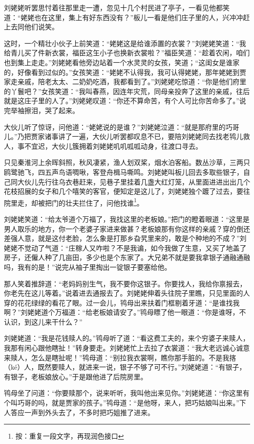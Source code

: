 \documentclass[12pt,oneside]{book}
\begin{document}
刘姥姥听罢思忖着往那里走一遭，忽见十几个村民进了亭子，一看见他都笑道：“姥姥也在这里，集上有好东西没有？”板儿一看是他们庄子里的人，兴冲冲赶上去同他们说笑。

这时，一个精壮小伙子上前笑道：“姥姥这是给谁添置的衣裳？”刘姥姥笑道：“我给青儿买了件新衣裳，福臣这玍小子也换新衣裳啦？”福臣笑道：“趁着农闲，咱们也到集上走走。”刘姥姥看他旁边站着一个水灵灵的女孩，笑道；“这闺女是谁家的，好像看到过似的。”女孩笑道：“姥姥不认得我，我可认得姥姥，那年姥姥到贾家走亲戚，陪老太太、二奶奶吃酒，我都看到了。”刘姥姥吃惊道：“你是他们府里的丫鬟吧？”女孩笑道：“我叫春燕，因连年灾荒，同母亲投奔了这里的亲戚，往后就是这庄子里的人了。”刘姥姥叹道：“你还不算命苦，有个人可比你苦命多了。”说完举袖擦泪，哭了起来。

大伙儿听了惊讶，问他道：“姥姥说的是谁？”刘姥姥泣道：“就是那府里的巧哥儿。”乃把贾家诸事讲了一遍，大伙儿听罢都叹息不已，要陪刘姥姥同去找老鸨儿救人，事不宜迟，大伙儿簇拥着刘姥姥叽叽呱呱动身，往渡口寻去。

只见秦淮河上余晖斜照，秋风凄紧，渔人划双桨，烟水泊客船。数丛沙草，三两只鸥鹭驰飞，四五声鸟语啁啾，客登舟楫马嘶鸣。刘姥姥叫板儿回去多取些银子，自己同大伙儿先行往乌衣巷赶来，见巷子里挂着几盏大红灯笼，从里面进进出出几个花枝招展的女子和几个嘻笑的客官，便知定是这儿了，刘姥姥独个踱了过去，要往院里走，却被把门的壮夫拦住了，问他找谁\footnote{按：重复一段文字，再现润色接口}。

刘姥姥笑道：“给太爷道个万福了，我找这里的老板娘。”把门的瞪着眼道：“这里是男人取乐的地方，你一个老婆子家进来做甚？老板娘那有你这样的亲戚？穿的倒还差强人意，就是这付老脸，怎么象是打那乡旮旯里来的，敢是个种地的不成？”刘姥姥不觉动了气道：“庄稼人又咋啦？不是我谝，如今我做了生意，又买了地盖了房子，还僱人种了几亩田，多少也是个东家了。大兄弟不就是要我拿银子通融通融吗，我有的是！”说完从袖子里掏出一锭银子要塞给他。

那人笑着推辞道：“老妈妈别生气，我不要你这银子。你要找人，我给你禀报去，你老先在这儿等着。”说着进去通报去了。刘姥姥伸着头往院子里瞧，只见里面的人穿的花花绿绿的看花了眼。过一会儿，鸨母出来扶着门框剔着牙道：“是谁找我啊？”刘姥姥道个万福道：“给老板娘请安了。”鸨母瞟了他一眼道：“你是谁呀，不认识，到这儿来干什么？”

刘姥姥道：“我是花钱赎人的。”鸨母听了道：“看这费工夫的，来个穷婆子来赎人，我那有闲心跟他瞎扯！”转身要走。刘姥姥忙上去拉了衣裳道：“我大老远诚心诚意来赎人，怎么是瞎扯呢！”鸨母道：“别拉我衣裳啊，瞧你那手脏的。不是我揢（ké）人，既然要赎人，就进来一说，银子不够了可不行。”刘姥姥道：“有银子，有银子，老板娘放心。”于是跟他进了后院房里。

鸨母坐了问道：“你要赎那个，说来听听，我叫他出来见你。”刘姥姥道：“你这里有个叫巧哥的吗，就是贾家的孩子。”鸨母道：“是他呀，来人，把巧姑娘叫出来。”下人答应一声到外头去了，不多时把巧姐推了进来。
\end{document}
